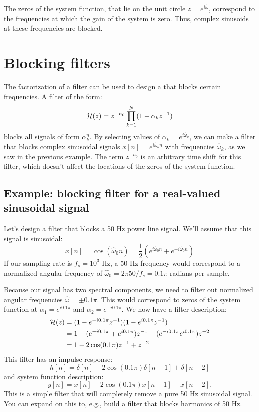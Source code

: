 The zeros of the system function, that lie on the unit circle $z=e^{i\hat{\omega}}$, correspond to the frequencies at which the gain of the system is zero. Thus, complex sinusoids at these frequencies are blocked. 


\section{Blocking filters}

The factorization of a filter can be used to design a  that blocks certain frequencies. A filter of the
form:
\begin{equation}
  \mathcal{H}(z) = z^{-n_0}\prod_{k=1}^{N} (1-\alpha_k z^{-1})
  \label{eq:blocking_filter}
\end{equation}
blocks all signals of form $\alpha_k^n$. By selecting values of
$\alpha_k = e^{i\hat{\omega}_k}$, we can make a filter that blocks
complex sinusoidal signals $x[n]=e^{i\hat{\omega}_k n}$ with
frequencies $\hat{\omega}_k$, as we saw in the previous example. The
term $z^{-n_0}$ is an arbitrary time shift for this filter, which
doesn't affect the locations of the zeros of the system function.

\subsection{Example: blocking filter for a real-valued sinusoidal signal}

Let's design a filter that blocks a 50 Hz power line signal. We'll assume that this signal is sinusoidal:
\begin{equation}
  x[n]=\cos(\hat{\omega}_0 n) = \frac{1}{2}(e^{i\hat{\omega}_0 n}+e^{-i\hat{\omega}_0 n})
\end{equation}
If our sampling rate is $f_s=10^3$ Hz, a 50 Hz frequency would
correspond to a normalized angular frequency of $\hat{\omega}_0=2\pi
50/f_s = 0.1\pi$ radians per sample.

Because our signal has two spectral components, we need to filter out
normalized angular frequencies $\hat{\omega}=\pm 0.1\pi$. This would
correspond to zeros of the system function at $\alpha_1=e^{i0.1\pi}$
and $\alpha_2=e^{-i0.1\pi}$. We now have a filter description:
\begin{align}
\mathcal{H}(z) & = (1-e^{-i 0.1 \pi} z^{-1})(1-e^{i 0.1 \pi} z^{-1}) \\
     &= 1 - (e^{-i0.1\pi} + e^{i0.1\pi})z^{-1} + (e^{-i0.1\pi} e^{i0.1\pi})z^{-2}\\
      &=1 - 2\cos(0.1\pi)z^{-1} + z^{-2}
\end{align}
This filter has an impulse response:
\begin{equation}
h[n] = \delta[n] -2\cos(0.1\pi)\delta[n-1] + \delta[n-2]
\end{equation}
and system function description:
\begin{equation}
y[n] = x[n] - 2\cos(0.1\pi)x[n-1]+x[n-2].
\end{equation}
This is a simple filter that will completely remove a pure 50 Hz
sinusoidal signal. You can expand on this to, e.g., build a filter that
blocks harmonics of 50 Hz.



